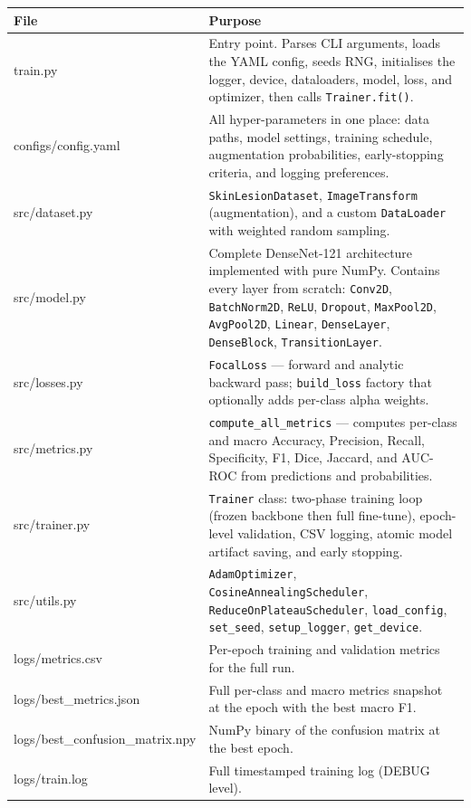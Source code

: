 \documentclass[12pt,a4paper]{report}
\begin{document}
\begin{longtable}{>{\ttfamily\small}p{4.2cm} p{11cm}}
  \toprule
  \normalfont\textbf{File} & \textbf{Purpose} \\
  \midrule
  \endhead
  \bottomrule
  \endfoot
  train.py
    & Entry point. Parses CLI arguments, loads the YAML config, seeds RNG, initialises the logger, device, dataloaders, model, loss, and optimizer, then calls \texttt{Trainer.fit()}. \\[4pt]
  configs/config.yaml
    & All hyper-parameters in one place: data paths, model settings, training schedule, augmentation probabilities, early-stopping criteria, and logging preferences. \\[4pt]
  src/dataset.py
    & \texttt{SkinLesionDataset}, \texttt{ImageTransform} (augmentation), and a custom \texttt{DataLoader} with weighted random sampling. \\[4pt]
  src/model.py
    & Complete DenseNet-121 architecture implemented with pure NumPy. Contains every layer from scratch: \texttt{Conv2D}, \texttt{BatchNorm2D}, \texttt{ReLU}, \texttt{Dropout}, \texttt{MaxPool2D}, \texttt{AvgPool2D}, \texttt{Linear}, \texttt{DenseLayer}, \texttt{DenseBlock}, \texttt{TransitionLayer}. \\[4pt]
  src/losses.py
    & \texttt{FocalLoss} — forward and analytic backward pass; \texttt{build\_loss} factory that optionally adds per-class alpha weights. \\[4pt]
  src/metrics.py
    & \texttt{compute\_all\_metrics} — computes per-class and macro Accuracy, Precision, Recall, Specificity, F1, Dice, Jaccard, and AUC-ROC from predictions and probabilities. \\[4pt]
  src/trainer.py
    & \texttt{Trainer} class: two-phase training loop (frozen backbone then full fine-tune), epoch-level validation, CSV logging, atomic model artifact saving, and early stopping. \\[4pt]
  src/utils.py
    & \texttt{AdamOptimizer}, \texttt{CosineAnnealingScheduler}, \texttt{ReduceOnPlateauScheduler}, \texttt{load\_config}, \texttt{set\_seed}, \texttt{setup\_logger}, \texttt{get\_device}. \\[4pt]
  logs/metrics.csv
    & Per-epoch training and validation metrics for the full run. \\[4pt]
  logs/best\_metrics.json
    & Full per-class and macro metrics snapshot at the epoch with the best macro F1. \\[4pt]
  logs/best\_confusion\_matrix.npy
    & NumPy binary of the confusion matrix at the best epoch. \\[4pt]
  logs/train.log
    & Full timestamped training log (DEBUG level). \\
\end{longtable}
\end{document}
